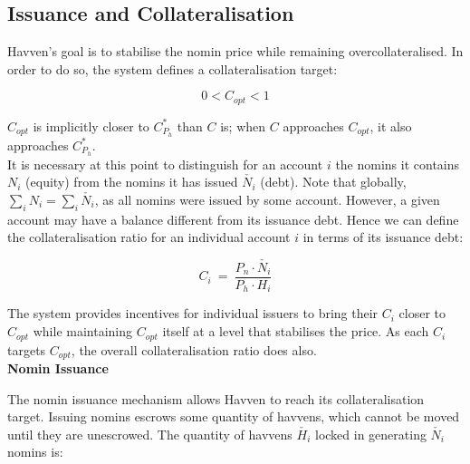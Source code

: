 \subsection{Issuance and Collateralisation} 

\noindent Havven's goal is to stabilise the nomin price while remaining
overcollateralised. In order to do so, the system defines a collateralisation target:

\begin{equation}
0 < C_{opt} < 1  \label{eq:target}
\end{equation}

\vspace{2 mm}

\noindent \(C_{opt}\) is implicitly closer to \(C^*_{P_h}\) than \(C\) is; when \(C\)
approaches \(C_{opt}\), it also approaches \(C^*_{P_h}\). \\

\noindent It is necessary at this point to distinguish for an account \(i\)
the nomins it contains \(N_i\) (equity) from the nomins it has issued
\(\check{N_i}\) (debt). Note that globally, \(\sum_{i}N_i = \sum_{i}\check{N_i}\),
as all nomins were issued by some account. However, a given account may have a
balance different from its issuance debt. Hence we can define the collateralisation
ratio for an individual account \(i\) in terms of its issuance debt:

\begin{equation}
C_i \ = \ \frac{P_n \cdot \check{N_i}}{P_h \cdot H_i}  \label{eq:individualcollateralisation}
\end{equation}

\vspace{2 mm}

\noindent The system provides incentives for individual issuers to bring
their \(C_i\) closer to \(C_{opt}\) while maintaining \(C_{opt}\) itself at a level
that stabilises the price. As each \(C_i\) targets \(C_{opt}\), the overall
collateralisation ratio does also. \\

\noindent \textbf{Nomin Issuance}

\vspace{1mm}

\noindent The nomin issuance mechanism allows Havven to reach its
collateralisation target. Issuing nomins escrows some quantity of havvens,
which cannot be moved until they are unescrowed. The quantity of havvens
\(\check{H_i}\) locked in generating \(\check{N_i}\) nomins is:

